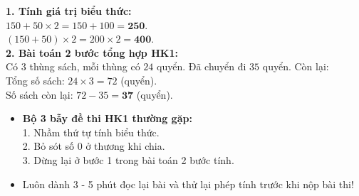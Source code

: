 \documentclass[11pt,a4paper]{article}
\begin{document}
\vspace{-2.5mm}
\noindent
\begin{minipage}[t]{0.49\textwidth}\vspace{0pt}
\begin{tcolorbox}[
  enhanced,
  colback=green!4!white,
  colframe=green!60!black,
  arc=2mm, boxrule=0.8pt,
  left=2mm, right=2mm, top=1.8mm, bottom=1.8mm,
  title={\footnotesize\bfseries\color{white}\faCheckCircle\ Ví dụ thực hành chuẩn mực}
]
{\footnotesize
\textbf{1. Tính giá trị biểu thức:}\\
$150 + 50 \times 2 = 150 + 100 = \mathbf{250}$.\\
$(150 + 50) \times 2 = 200 \times 2 = \mathbf{400}$.\\
\textbf{2. Bài toán 2 bước tổng hợp HK1:}\\
Có $3$ thùng sách, mỗi thùng có $24$ quyển. Đã chuyển đi $35$ quyển. Còn lại:\\
Tổng số sách: $24 \times 3 = 72$ (quyển).\\
Số sách còn lại: $72 - 35 = \mathbf{37}$ (quyển).
}
\end{tcolorbox}
\end{minipage}
\hfill
\begin{minipage}[t]{0.49\textwidth}\vspace{0pt}
\begin{tcolorbox}[
  enhanced,
  colback=red!4!white,
  colframe=red!70!black,
  arc=2mm, boxrule=0.8pt,
  left=2mm, right=2mm, top=1.8mm, bottom=1.8mm,
  title={\footnotesize\bfseries\color{white}\faExclamationTriangle\ Mẹo tránh bẫy trắc nghiệm}
]
{\footnotesize
\begin{itemize}\setlength{\itemsep}{1.5pt}\setlength{\leftskip}{-2.5mm}
  \item \textbf{Bộ 3 bẫy đề thi HK1 thường gặp:}\\
  1. Nhầm thứ tự tính biểu thức.\\
  2. Bỏ sót số 0 ở thương khi chia.\\
  3. Dừng lại ở bước 1 trong bài toán 2 bước tính.
  \item Luôn dành 3 - 5 phút đọc lại bài và thử lại phép tính trước khi nộp bài thi!
\end{itemize}
}
\end{tcolorbox}
\end{minipage}
\end{document}
